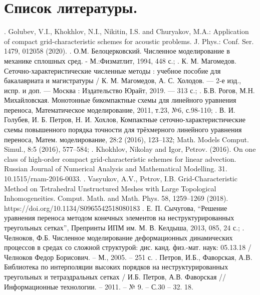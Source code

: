 \documentclass[14pt]{article}
\begin{document}
\section*{Список литературы.}
. Golubev, V.I., Khokhlov, N.I., Nikitin, I.S. and Churyakov, M.A.: Application of compact grid-characteristic schemes for acoustic problems. J. Phys.: Conf. Ser. 1479, 012058 (2020).
. О.М. Белоцерковский. Численное моделирование в механике сплошных сред. - М.:Физматлит, 1994, 448 с.;
. \: К. М. Магомедов.  Сеточно-характеристические численные методы : учебное пособие для бакалавриата и магистратуры / К. М. Магомедов, А. С. Холодов. — 2-е изд., испр. и доп. — Москва : Издательство Юрайт, 2019. — 313 с.;
. \: Б.В. Рогов, М.Н. Михайловская. Монотонные бикомпактные схемы для линейного уравнения переноса, Математическое моделирование, 2011, т.23, №6, с.98-110; 
. \: В. И. Голубев, И. Б. Петров, Н. И. Хохлов, Компактные сеточно-характеристические схемы повышенного порядка точности для трёхмерного линейного уравнения переноса, Матем. моделирование, 28:2 (2016), 123–132; Math. Models Comput. Simul., 8:5 (2016), 577–584;
. \: Khokhlov, Nikolay and Igor, Petrov. (2016). On one class of high-order compact grid-characteristic schemes for linear advection. Russian Journal of Numerical Analysis and Mathematical Modelling. 31. 10.1515/rnam-2016-0033. 
. \: Vasyukov, A.V., Petrov, I.B. Grid-Characteristic Method on Tetrahedral Unstructured Meshes with Large Topological Inhomogeneities. Comput. Math. and Math. Phys. 58, 1259–1269 (2018). https://doi.org/10.1134/S0965542518080183
. \: Е. П. Сычугова, “Решение уравнения переноса методом конечных элементов на неструктурированных треугольных сетках”, Препринты ИПМ им. М. В. Келдыша, 2013, 085, 24 с.;
. \: Челноков, Ф.Б. Численное моделирование деформационных динамических
процессов в средах со сложной структурой: дис. канд. физ.-мат. наук:
05.13.18 / Челноков Федор Борисович. – М., 2005. – 251 с.
. \: Петров, И.Б., Фаворская, А.В. Библиотека по интерполяции высоких порядков на неструктурированных треугольных и тетраэдральных сетках / И.Б. Петров, А.В. Фаворская // Информационные технологии. – 2011. – № 9. – С.30 – 32. 18. 
\newline
\end{document}
